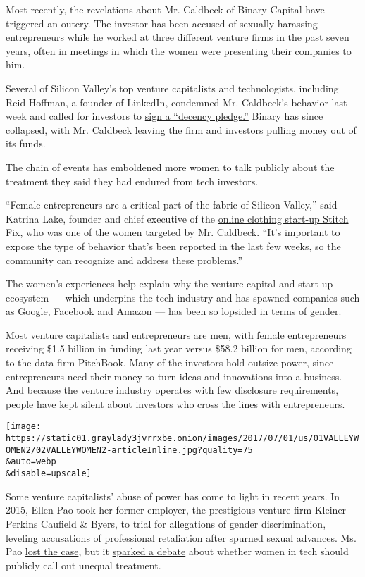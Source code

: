 Most recently, the revelations about Mr. Caldbeck of Binary Capital have
triggered an outcry. The investor has been accused of sexually harassing
entrepreneurs while he worked at three different venture firms in the
past seven years, often in meetings in which the women were presenting
their companies to him.

Several of Silicon Valley's top venture capitalists and technologists,
including Reid Hoffman, a founder of LinkedIn, condemned Mr. Caldbeck's
behavior last week and called for investors to
\href{https://www.linkedin.com/pulse/human-rights-women-entrepreneurs-reid-hoffman}{sign
a ``decency pledge.''} Binary has since collapsed, with Mr. Caldbeck
leaving the firm and investors pulling money out of its funds.

The chain of events has emboldened more women to talk publicly about the
treatment they said they had endured from tech investors.

``Female entrepreneurs are a critical part of the fabric of Silicon
Valley,'' said Katrina Lake, founder and chief executive of the
\href{https://www.nytimes3xbfgragh.onion/2017/05/10/business/dealbook/as-department-stores-close-stitch-fix-expands-online.html}{online
clothing start-up Stitch Fix}, who was one of the women targeted by Mr.
Caldbeck. ``It's important to expose the type of behavior that's been
reported in the last few weeks, so the community can recognize and
address these problems.''

The women's experiences help explain why the venture capital and
start-up ecosystem --- which underpins the tech industry and has spawned
companies such as Google, Facebook and Amazon --- has been so lopsided
in terms of gender.

Most venture capitalists and entrepreneurs are men, with female
entrepreneurs receiving \$1.5 billion in funding last year versus \$58.2
billion for men, according to the data firm PitchBook. Many of the
investors hold outsize power, since entrepreneurs need their money to
turn ideas and innovations into a business. And because the venture
industry operates with few disclosure requirements, people have kept
silent about investors who cross the lines with entrepreneurs.

\texttt{[image: https://static01.graylady3jvrrxbe.onion/images/2017/07/01/us/01VALLEYWOMEN2/02VALLEYWOMEN2-articleInline.jpg?quality=75\\\&auto=webp\\\&disable=upscale]}

Some venture capitalists' abuse of power has come to light in recent
years. In 2015, Ellen Pao took her former employer, the prestigious
venture firm Kleiner Perkins Caufield \& Byers, to trial for allegations
of gender discrimination, leveling accusations of professional
retaliation after spurned sexual advances. Ms. Pao
\href{https://www.nytimes3xbfgragh.onion/2015/03/28/technology/ellen-pao-kleiner-perkins-case-decision.html}{lost
the case}, but it
\href{http://www.nytimes3xbfgragh.onion/2012/06/03/technology/lawsuit-against-kleiner-perkins-is-shaking-silicon-valley.html}{sparked
a debate} about whether women in tech should publicly call out unequal
treatment.

